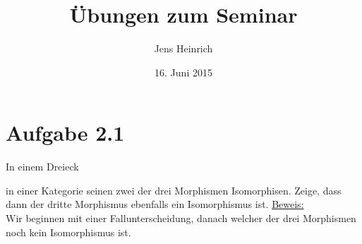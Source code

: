 \documentclass{article}
\title{\"Ubungen zum Seminar \boldfont{Kategorientheorie} }
\author{Jens Heinrich}
\date{16. Juni 2015}
\begin{document}
 

\section*{Aufgabe 2.1}
	In einem Dreieck 

	
	in einer Kategorie seinen zwei der drei Morphismen Isomorphisen.
	Zeige, dass dann der dritte Morphismus ebenfalls ein Isomorphismus ist.
	\underline{Beweis:} \\
		Wir beginnen mit einer Fallunterscheidung, danach welcher der drei Morphismen noch kein Isomorphismus ist.
\end{document}
